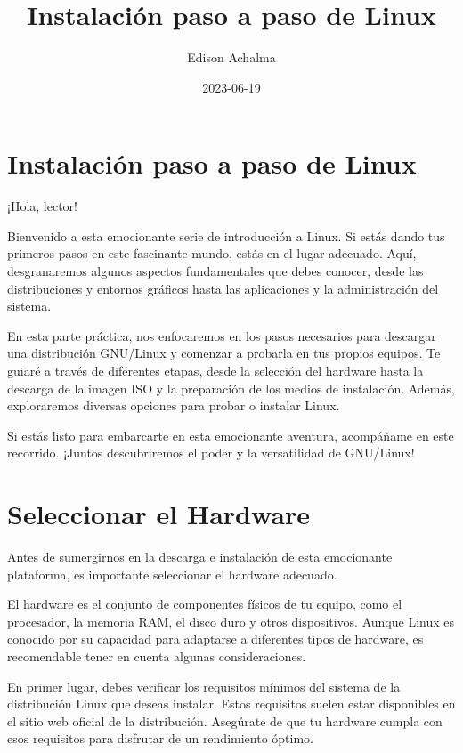\documentclass[
  jou,
  floatsintext,
  longtable,
  a4paper,
  nolmodern,
  notxfonts,
  notimes,
  12pt,
  colorlinks=true,linkcolor=blue,citecolor=blue,urlcolor=blue]{apa7}
\title{Instalación paso a paso de Linux}
\author{Edison Achalma}
\affiliation{
{Escuela Profesional de Economía, Universidad Nacional de San Cristóbal
de Huamanga}}
\date{2023-06-19}
\begin{document}
\maketitle


\hypertarget{toc}{}
\tableofcontents
\newpage
\section[Introduction]{Instalación paso a paso de Linux}

\setcounter{secnumdepth}{3}

\setlength\LTleft{0pt}




¡Hola, lector!

Bienvenido a esta emocionante serie de introducción a Linux. Si estás
dando tus primeros pasos en este fascinante mundo, estás en el lugar
adecuado. Aquí, desgranaremos algunos aspectos fundamentales que debes
conocer, desde las distribuciones y entornos gráficos hasta las
aplicaciones y la administración del sistema.

En esta parte práctica, nos enfocaremos en los pasos necesarios para
descargar una distribución GNU/Linux y comenzar a probarla en tus
propios equipos. Te guiaré a través de diferentes etapas, desde la
selección del hardware hasta la descarga de la imagen ISO y la
preparación de los medios de instalación. Además, exploraremos diversas
opciones para probar o instalar Linux.

Si estás listo para embarcarte en esta emocionante aventura, acompáñame
en este recorrido. ¡Juntos descubriremos el poder y la versatilidad de
GNU/Linux!

\section{Seleccionar el Hardware}\label{seleccionar-el-hardware}

Antes de sumergirnos en la descarga e instalación de esta emocionante
plataforma, es importante seleccionar el hardware adecuado.

El hardware es el conjunto de componentes físicos de tu equipo, como el
procesador, la memoria RAM, el disco duro y otros dispositivos. Aunque
Linux es conocido por su capacidad para adaptarse a diferentes tipos de
hardware, es recomendable tener en cuenta algunas consideraciones.

En primer lugar, debes verificar los requisitos mínimos del sistema de
la distribución Linux que deseas instalar. Estos requisitos suelen estar
disponibles en el sitio web oficial de la distribución. Asegúrate de que
tu hardware cumpla con esos requisitos para disfrutar de un rendimiento
óptimo.
\end{document}
